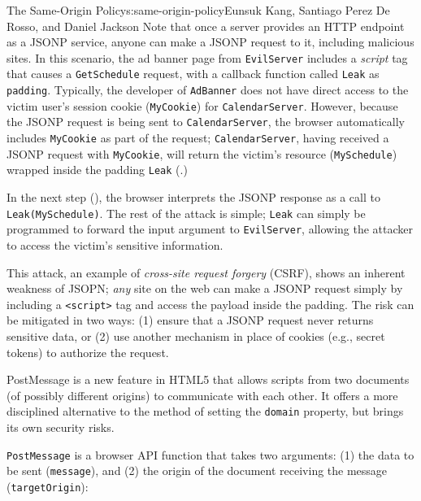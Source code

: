 \begin{aosachapter}{The Same-Origin Policy}{s:same-origin-policy}{Eunsuk Kang, Santiago Perez De Rosso, and Daniel Jackson}
Note that once a server provides an HTTP endpoint as a JSONP service,
anyone can make a JSONP request to it, including malicious sites. In
this scenario, the ad banner page from \texttt{EvilServer} includes a
\emph{script} tag that causes a \texttt{GetSchedule} request, with a
callback function called \texttt{Leak} as \texttt{padding}. Typically,
the developer of \texttt{AdBanner} does not have direct access to the
victim user's session cookie (\texttt{MyCookie}) for
\texttt{CalendarServer}. However, because the JSONP request is being
sent to \texttt{CalendarServer}, the browser automatically includes
\texttt{MyCookie} as part of the request; \texttt{CalendarServer},
having received a JSONP request with \texttt{MyCookie}, will return the
victim's resource (\texttt{MySchedule}) wrapped inside the padding
\texttt{Leak} (.)


In the next step (), the
browser interprets the JSONP response as a call to
\texttt{Leak(MySchedule)}. The rest of the attack is simple;
\texttt{Leak} can simply be programmed to forward the input argument to
\texttt{EvilServer}, allowing the attacker to access the victim's
sensitive information.


This attack, an example of \emph{cross-site request forgery} (CSRF),
shows an inherent weakness of JSOPN; \emph{any} site on the web can make
a JSONP request simply by including a
\texttt{\textless{}script\textgreater{}} tag and access the payload
inside the padding. The risk can be mitigated in two ways: (1) ensure
that a JSONP request never returns sensitive data, or (2) use another
mechanism in place of cookies (e.g., secret tokens) to authorize the
request.

\label{postmessage}

PostMessage is a new feature in HTML5 that allows scripts from two
documents (of possibly different origins) to communicate with each
other. It offers a more disciplined alternative to the method of setting
the \texttt{domain} property, but brings its own security risks.

\texttt{PostMessage} is a browser API function that takes two arguments:
(1) the data to be sent (\texttt{message}), and (2) the origin of the
document receiving the message (\texttt{targetOrigin}):


\end{aosachapter}
